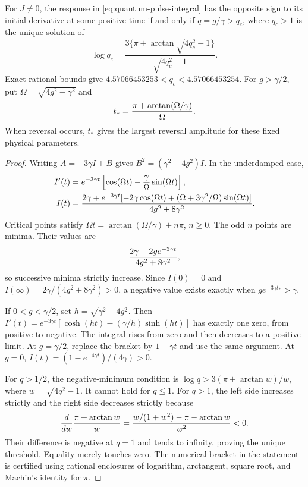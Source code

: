 \begin{theorem}
\label{thm:quantum-pulse-threshold}
For $J\ne0$, the response in \eqref{eq:quantum-pulse-integral} has the
opposite sign to its initial derivative at some positive time if and only if
$q=g/\gamma>q_c$, where $q_c>1$ is the unique solution of
\begin{equation}
 \log q_c=\frac{3\{\pi+\arctan\sqrt{4q_c^2-1}\}}
                         {\sqrt{4q_c^2-1}}.
 \label{eq:quantum-critical-ratio}
\end{equation}
Exact rational bounds give
$4.57066453253<q_c<4.57066453254$.
For $g>\gamma/2$, put $\Omega=\sqrt{4g^2-\gamma^2}$ and
\begin{equation}
 t_*={\pi+\arctan(\Omega/\gamma)\over\Omega}.
\end{equation}
When reversal occurs, $t_*$ gives the largest reversal amplitude for these
fixed physical parameters.
\end{theorem}

\begin{proof}
Writing $A=-3\gamma I+B$ gives $B^2=(\gamma^2-4g^2)I$. In the
underdamped case,
\begin{align}
 I'(t)&=e^{-3\gamma t}
   \left[\cos(\Omega t)-{\gamma\over\Omega}\sin(\Omega t)\right],\\
 I(t)&={2\gamma+e^{-3\gamma t}
  [-2\gamma\cos(\Omega t)
     +(\Omega+3\gamma^2/\Omega)\sin(\Omega t)]
       \over4g^2+8\gamma^2}.
 \label{eq:quantum-pulse-closed}
\end{align}
Critical points satisfy
$\Omega t=\arctan(\Omega/\gamma)+n\pi$, $n\ge0$. The odd $n$ points
are minima. Their values are
\begin{equation}
 {2\gamma-2g e^{-3\gamma t}\over4g^2+8\gamma^2},
\end{equation}
so successive minima strictly increase. Since $I(0)=0$ and
$I(\infty)=2\gamma/(4g^2+8\gamma^2)>0$, a negative value exists exactly
when $g e^{-3\gamma t_*}>\gamma$.

If $0<g<\gamma/2$, set $h=\sqrt{\gamma^2-4g^2}$. Then
$I'(t)=e^{-3\gamma t}[\cosh(ht)-(\gamma/h)\sinh(ht)]$ has exactly
one zero, from positive to negative. The integral rises from zero and then
decreases to a positive limit. At $g=\gamma/2$, replace the bracket by
$1-\gamma t$ and use the same argument. At $g=0$,
$I(t)=(1-e^{-4\gamma t})/(4\gamma)>0$.

For $q>1/2$, the negative-minimum condition is
$\log q>3(\pi+\arctan w)/w$, where $w=\sqrt{4q^2-1}$.
It cannot hold for $q\le1$. For $q>1$, the left side increases strictly
and the right side decreases strictly because
\begin{equation}
 {d\over dw}{\pi+\arctan w\over w}
 ={w/(1+w^2)-\pi-\arctan w\over w^2}<0.
\end{equation}
Their difference is negative at $q=1$ and tends to infinity, proving the
unique threshold. Equality merely touches zero. The numerical bracket in the
statement is certified using rational enclosures of logarithm, arctangent,
square root, and Machin's identity for $\pi$.
\end{proof}

